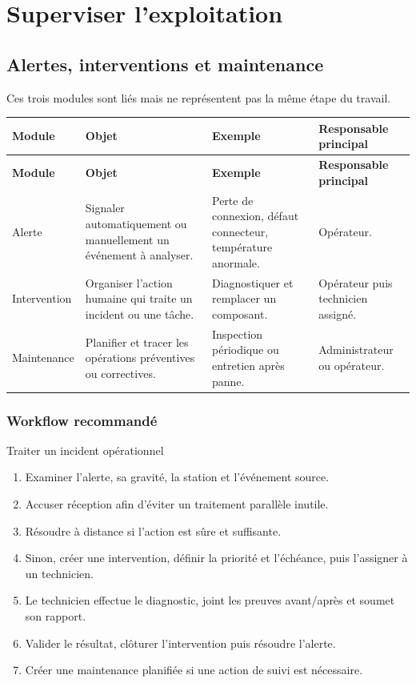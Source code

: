 \chapter{Superviser l'exploitation}

\section{Alertes, interventions et maintenance}

Ces trois modules sont liés mais ne représentent pas la même étape du travail.

\begin{longtable}{|L{3.1cm}|L{4.7cm}|L{4.5cm}|L{3.2cm}|}
  \hline
  \textbf{Module} & \textbf{Objet} & \textbf{Exemple} & \textbf{Responsable
  principal} \\ \hline
  \endfirsthead
  \hline
  \textbf{Module} & \textbf{Objet} & \textbf{Exemple} & \textbf{Responsable
  principal} \\ \hline
  \endhead
  Alerte &
  Signaler automatiquement ou manuellement un événement à analyser. &
  Perte de connexion, défaut connecteur, température anormale. &
  Opérateur. \\ \hline
  Intervention &
  Organiser l'action humaine qui traite un incident ou une tâche. &
  Diagnostiquer et remplacer un composant. &
  Opérateur puis technicien assigné. \\ \hline
  Maintenance &
  Planifier et tracer les opérations préventives ou correctives. &
  Inspection périodique ou entretien après panne. &
  Administrateur ou opérateur. \\ \hline
\end{longtable}

\subsection{Workflow recommandé}

\begin{procedurebox}{Traiter un incident opérationnel}
  \begin{enumerate}[leftmargin=*]
    \item Examiner l'alerte, sa gravité, la station et l'événement source.
    \item Accuser réception afin d'éviter un traitement parallèle inutile.
    \item Résoudre à distance si l'action est sûre et suffisante.
    \item Sinon, créer une intervention, définir la priorité et l'échéance,
    puis l'assigner à un technicien.
    \item Le technicien effectue le diagnostic, joint les preuves avant/après et
    soumet son rapport.
    \item Valider le résultat, clôturer l'intervention puis résoudre l'alerte.
    \item Créer une maintenance planifiée si une action de suivi est nécessaire.
  \end{enumerate}
\end{procedurebox}

